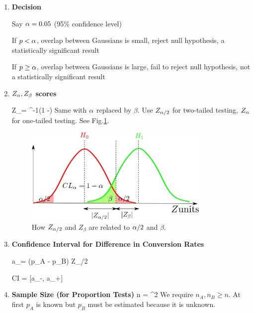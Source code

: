 \begin{enumerate}
\item {\bf Decision}

Say $\alpha=0.05$ (95\% confidence level)

If $p< \alpha$,  overlap between Gaussians is small, reject null hypothesis,
a statistically significant result

If $p \geq \alpha$, overlap between Gaussians is large, fail to reject null hypothesis, not a statistically significant result

\item {\bf $Z_\alpha, Z_\beta$  scores}

\beq
Z_\alp=
\Phi^{-1}(1 -\alp)
\eeq
Same with $\alpha$ replaced by $\beta$.
Use $Z_{\alpha/2}$ for two-tailed testing, $Z_\alpha$ for one-tailed testing. See Fig.\ref{fig-alp-beta-z}.

\begin{figure}[h!]
\centering
\includegraphics[width=3.5in]
{a-b-testing/alp-beta-z.png}
\caption{How $Z_{\alpha/2}$ and $Z_\beta$ are
related to $\alpha/2$ and $\beta$.}
\label{fig-alp-beta-z}
\end{figure}

\item {\bf Confidence Interval for Difference in Conversion Rates} 

\beq
a_\pm = (p_A - p_B) \pm Z_{\alpha/2} 
\eeq

\beq
CI = [a_-, a_+]
\eeq



\item {\bf Sample Size 
(for Proportion Tests)}
\beq
n = 
^2
\eeq
We require $n_A, n_B\geq n$.
At first $p_A$ is known but $p_B$ 
must be
estimated because it is unknown.
\end{enumerate}
